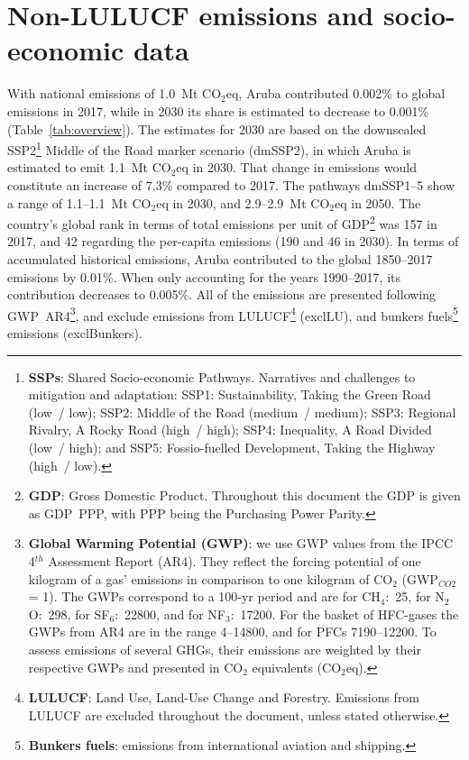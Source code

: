 \documentclass[12pt]{article}
\begin{document}
 \section{Non-LULUCF emissions and socio-economic data}
 \label{sec:nonLULUCFSocioEco}
 With national emissions of 1.0~Mt CO$_2$eq, Aruba contributed 0.002\% to global emissions in 2017, while in 2030 its share is estimated to decrease to 0.001\% (Table~\ref{tab:overview}).
 The estimates for 2030 are based on the downscaled SSP2\footnote{\textbf{SSPs}: Shared Socio-economic Pathways.
 Narratives and challenges to mitigation and adaptation: 
 SSP1: Sustainability, Taking the Green Road (low~/ low);
 SSP2: Middle of the Road (medium~/ medium);
 SSP3: Regional Rivalry, A Rocky Road (high~/ high);
 SSP4: Inequality, A Road Divided (low~/ high); and
 SSP5: Fossio-fuelled Development, Taking the Highway (high~/ low).} Middle of the Road marker scenario (dmSSP2), in which Aruba is estimated to emit 1.1~Mt CO$_2$eq in 2030.
 That change in emissions would constitute an increase of 7.3\% compared to 2017. 
 The pathways dmSSP1--5 show a range of 1.1--1.1~Mt CO$_2$eq in 2030, and 2.9--2.9~Mt CO$_2$eq in 2050.
 The country's global rank in terms of total emissions per unit of GDP\footnote{\textbf{GDP}: Gross Domestic Product. 
 Throughout this document the GDP is given as GDP~PPP, with PPP being the Purchasing Power Parity.} was 157 in 2017, and 42 regarding the per-capita emissions (190 and 46 in 2030).
 In terms of accumulated historical emissions, Aruba contributed to the global 1850--2017 emissions by 0.01\%. 
 When only accounting for the years 1990--2017, its contribution decreases to 0.005\%.
 All of the emissions are presented following GWP~AR4\footnote{\textbf{Global Warming Potential (GWP)}: we use GWP values from the IPCC 4$^{th}$ Assessment Report (AR4). 
 They reflect the forcing potential of one kilogram of a gas' emissions in comparison to one kilogram of CO$_2$ (GWP$_{CO2}$ = 1). 
 The GWPs correspond to a 100-yr period and are for CH$_4$:~25, for N$_2$O:~298, for SF$_6$:~22800, and for NF$_3$:~17200. 
 For the basket of HFC-gases the GWPs from AR4 are in the range 4--14800, and for PFCs 7190--12200. 
 To assess emissions of several GHGs, their emissions are weighted by their respective GWPs and presented in CO$_2$ equivalents (CO$_2$eq).}, and exclude emissions from LULUCF\footnote{\textbf{LULUCF}: Land Use, Land-Use Change and Forestry. 
 Emissions from LULUCF are excluded throughout the document, unless stated otherwise.} (exclLU), and bunkers fuels\footnote{\textbf{Bunkers fuels}: emissions from international aviation and shipping.} emissions (exclBunkers).
\end{document}
